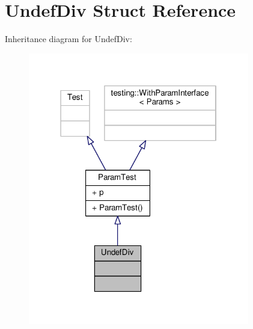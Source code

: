 \hypertarget{struct_undef_div}{}\section{Undef\+Div Struct Reference}
\label{struct_undef_div}


Inheritance diagram for Undef\+Div\+:
\nopagebreak
\begin{figure}[H]
\begin{center}
\leavevmode
\includegraphics[width=274pt]{struct_undef_div__inherit__graph}
\end{center}
\end{figure}


